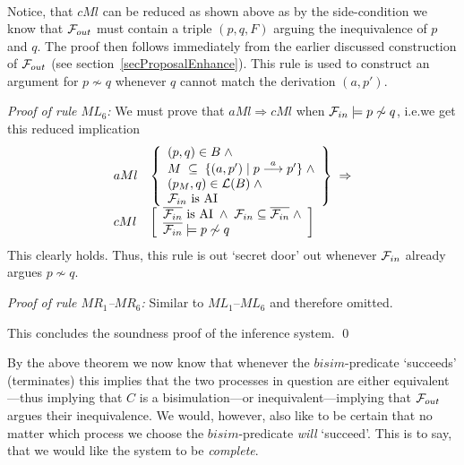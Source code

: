 \begin{theorem}[Soundness]
\begin{trivlist}
\[\begin{array}{ll}
\end{array}
\]
Notice, that $cMl$ can be reduced as shown above as by the side-condition we know that ${\cal F}_{out}$ must contain a triple $(p,q,F)$ arguing the inequivalence of $p$ and $q$. The proof then follows immediately from the earlier discussed construction of ${\cal F}_{out}$ (see section~\ref{secProposalEnhance}). This rule is used to construct an argument for $p\not\sim q$ whenever $q$ cannot match the derivation $(a,p')$.

\item[\it Proof of rule\/ $ML_6$:]
We must prove that $aMl\Rightarrow cMl$ when ${\cal F}_{in}\models p\not\sim q$, i.e.\@ we get this reduced implication
\[
\begin{array}{ll}
aMl &
\left\{
\begin{array}{l}
(p,q)\in B\;\wedge\\
M\;\subseteq\;\{(a,p')\mid p\stackrel{a}{\longrightarrow}p'\}\;\wedge\\
(p_{M},q)\in{\cal L}(B)\;\wedge\\
{\cal F}_{in} \mbox{ is AI}
\end{array}\right\}\;\Rightarrow\\

cMl &
\left[
\begin{array}{l}
\overline{{\cal F}_{in}}  \mbox{ is AI} \;\wedge\;{\cal F}_{in}\subseteq\overline{{\cal F}_{in}}\;\wedge\\
\overline{{\cal F}_{in}}\models p\not\sim q
\end{array}
\right]
\end{array}
\]
This clearly holds. Thus, this rule is out `secret door' out whenever ${\cal F}_{in}$ already argues $p\not\sim q$.

\item[\it Proof of rule\/ $MR_1$--$MR_6$:] Similar to $ML_1$--$ML_6$ and therefore omitted.
\end{trivlist}
\noindent
This concludes the soundness proof of the inference system.
\qed
\end{theorem}

By the above theorem we now know that whenever the $bisim$-predicate `succeeds' (terminates) this implies that the two processes in question are either equivalent---thus implying that $C$ is a bisimulation---or inequivalent---implying that ${\cal F}_{out}$ argues their inequivalence. We would, however, also like to be certain that no matter which process we choose the $bisim$-predicate {\em will\/} `succeed'. This is to say, that we would like the system to be {\em complete}.


